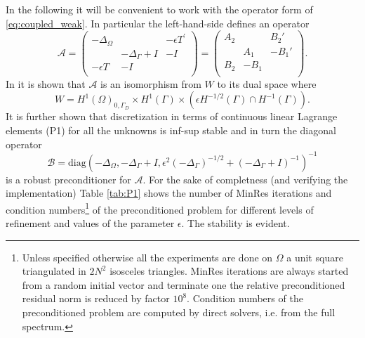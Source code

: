 \documentclass[r]{siamart171218}
\begin{document}
In the following it will be convenient to work with the operator form of
\eqref{eq:coupled_weak}. In particular the left-hand-side defines an operator
%
\begin{equation}\label{eq:operator2d}
  \mathcal{A} = \begin{pmatrix}
    -\Delta_{\Omega} & & -\epsilon T^{\prime}\\
    & -\Delta_{\Gamma} + I & -I\\
    -\epsilon T & -I & \\
  \end{pmatrix} =
  \begin{pmatrix}
    A_2 &  & B_2'\\
    & A_1 & -B_1'\\
    B_2 & -B_1 & \\
   \end{pmatrix}.
\end{equation}
In \cite{kuchta2016preconditioners} it is shown that $\mathcal{A}$ is an
isomorphism from $W$ to its dual space where
\[
W=H^1(\Omega)_{0, \Gamma_D}\times H^1{(\Gamma)}\times(\epsilon H^{-1/2}(\Gamma)\cap H^{-1}(\Gamma)).
\]
It is further shown that discretization in terms of continuous linear Lagrange
elements (P1) for all the unknowns is inf-sup stable and in turn the diagonal operator
\begin{equation}\label{eq:P1_precond}
\mathcal{B}=\text{diag}(-\Delta_{\Omega}, -\Delta_{\Gamma}+I, \epsilon^2(-\Delta_{\Gamma})^{-1/2}+(-\Delta_{\Gamma}+I)^{-1})^{-1}
\end{equation}
is a robust preconditioner for $\mathcal{A}$. For the sake of completness
(and verifying the implementation) Table \ref{tab:P1} shows the number of
MinRes iterations and condition numbers\footnote{
  Unless specified otherwise all the experiments are done on $\Omega$ a unit square
  triangulated in $2N^2$ isosceles triangles. MinRes iterations are always started
  from a random initial vector and terminate one the relative preconditioned residual
  norm is reduced by factor $10^{8}$. Condition numbers of the preconditioned problem
  are computed by direct solvers, i.e. from the full spectrum.
} of the preconditioned problem for
different levels of refinement and values of the parameter $\epsilon$. The
stability is evident.
%
\end{document}
